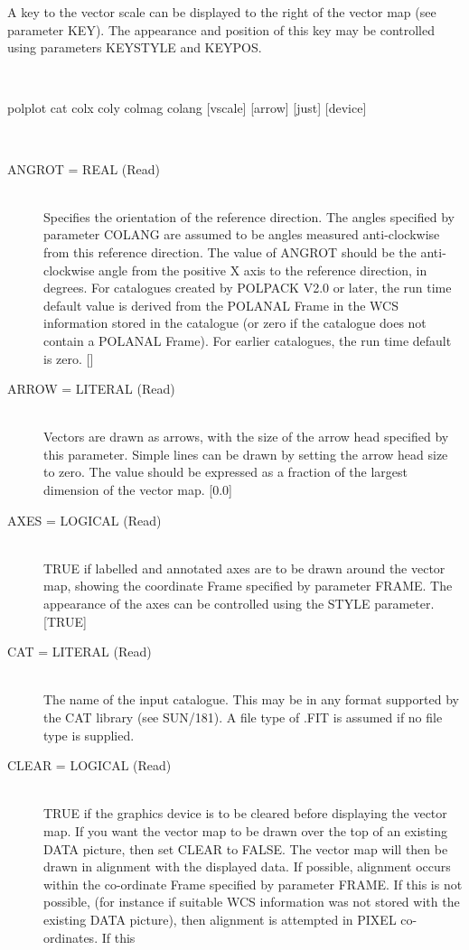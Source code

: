 \documentclass[twoside,11pt]{article}
\newcommand{\xref}[3]{#1}
\renewcommand{\_}{\texttt{\symbol{95}}}
\newcommand{\sstusage}[1]{\item[Usage:] \mbox{}
\\[1.3ex]{\raggedright \ssttt #1}}
\newcommand{\sstparameters}[1]{
   \item[Parameters:] \mbox{} \\
   \vspace{-3.5ex}
   \begin{description}
      #1
   \end{description}
}
\newcommand{\sstsubsection}[1]{ \item[{#1}] \mbox{} \\}
\newcommand{\sstusage}[1]{\item[Usage:]
      \begin{description}
         {\ssttt #1}
      \end{description}
      \\
   }
\newcommand{\sstparameters}[1]{
      \item[Parameters:] \\
      \begin{description}
         #1
      \end{description}
      \\
   }
\newcommand{\sstsubsection}[1]{\item[{#1}]}
\begin{document}
{{      A key to the vector scale can be displayed to the right of the
      vector map (see parameter KEY). The appearance and position of this
      key may be controlled using parameters KEYSTYLE and KEYPOS.
   }
   \sstusage{
      polplot cat colx coly colmag colang [vscale] [arrow] [just] [device]
   }
   \sstparameters{
      \sstsubsection{
         ANGROT = \_REAL (Read)
      }{
         Specifies the orientation of the reference direction. The angles
         specified by parameter COLANG are assumed to be angles measured
         anti-clockwise from this reference direction. The value of ANGROT
         should be the anti-clockwise angle from the positive X axis to the
         reference direction, in degrees. For catalogues created by
         POLPACK V2.0 or later, the run time default value is derived from
         the POLANAL Frame in the WCS information stored in the catalogue
         (or zero if the catalogue does not contain a POLANAL Frame).
         For earlier catalogues, the run time default is zero. []
      }
      \sstsubsection{
         ARROW = LITERAL (Read)
      }{
         Vectors are drawn as arrows, with the size of the arrow head
         specified by this parameter. Simple lines can be drawn by setting
         the arrow head size to zero. The value should be expressed as a
         fraction of the largest dimension of the vector map. [0.0]
      }
      \sstsubsection{
         AXES = \_LOGICAL (Read)
      }{
         TRUE if labelled and annotated axes are to be drawn around the
         vector map, showing the coordinate Frame specified by parameter
         FRAME. The appearance of the axes can be controlled using
         the STYLE parameter. [TRUE]
      }
      \sstsubsection{
         CAT = LITERAL (Read)
      }{
         The name of the input catalogue. This may be in any format
         supported by the CAT library (see \xref{SUN/181}{sun181}{}). A file type of .FIT
         is assumed if no file type is supplied.
      }
      \sstsubsection{
         CLEAR = \_LOGICAL (Read)
      }{
         TRUE if the graphics device is to be cleared before displaying
         the vector map. If you want the vector map to be drawn over
         the top of an existing DATA picture, then set CLEAR to FALSE. The
         vector map will then be drawn in alignment with the displayed
         data. If possible, alignment occurs within the co-ordinate Frame
         specified by parameter FRAME. If this is not possible, (for instance
         if suitable WCS information was not stored with the existing DATA
         picture), then alignment is attempted in PIXEL co-ordinates. If this
}}}
\end{document}
